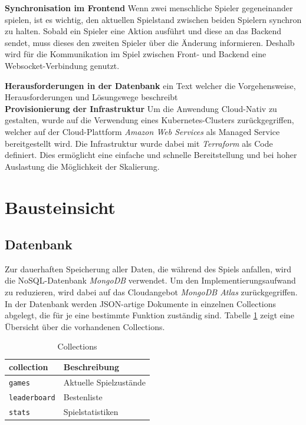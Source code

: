 \documentclass[a4paper, 10pt, conference]{IEEEtran}
\begin{document}
\textbf{Synchronisation im Frontend}
Wenn zwei menschliche Spieler gegeneinander spielen, ist es wichtig, den aktuellen Spielstand zwischen beiden Spielern synchron zu halten. Sobald ein Spieler eine Aktion ausführt und diese an das Backend sendet, muss dieses den zweiten Spieler über die Änderung informieren. Deshalb wird für die Kommunikation im Spiel zwischen Front- und Backend eine Websocket-Verbindung genutzt.

\textbf{Herausforderungen in der Datenbank} 
ein Text welcher die Vorgehensweise, Herausforderungen und Lösungswege beschreibt\\
\textbf{Provisionierung der Infrastruktur} 
Um die Anwendung Cloud-Nativ zu gestalten, wurde auf die Verwendung eines Kubernetes-Clusters zurückgegriffen, welcher auf der Cloud-Plattform \textit{Amazon Web Services} als Managed Service bereitgestellt wird. Die Infrastruktur wurde dabei mit \textit{Terraform} als Code definiert. Dies ermöglicht eine einfache und schnelle Bereitstellung und bei hoher Auslastung die Möglichkeit der Skalierung.\\

\section{Bausteinsicht}\label{sec:bausteinsicht}



\subsection{Datenbank}\label{subsec:datenbank}
Zur dauerhaften Speicherung aller Daten, die während des Spiels anfallen, wird die NoSQL-Datenbank \textit{MongoDB} \cite{mongodb} verwendet. Um den Implementierungsaufwand zu reduzieren, wird dabei auf das Cloudangebot \textit{MongoDB Atlas} \cite{mongodb-atlas} zurückgegriffen. In der Datenbank werden JSON-artige Dokumente in einzelnen Collections abgelegt, die für je eine bestimmte Funktion zuständig sind. Tabelle \ref{tab:collections} zeigt eine Übersicht über die vorhandenen Collections.

\begin{table}[h!]
    \begin{center}
        \caption{Collections}
        \label{tab:collections}
        \begin{tabular}{|l|l|}
            \textbf{collection} & \textbf{Beschreibung}\\
            \hline
            \texttt{games}				& Aktuelle Spielzustände\\
            \texttt{leaderboard}					& Bestenliste\\
            \texttt{stats}	& Spielstatistiken\\
        \end{tabular}
    \end{center}
\end{table}
\end{document}
